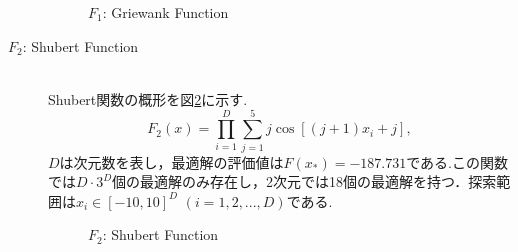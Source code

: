 \documentclass[a4j,11pt]{jarticle}
\begin{document}
\begin{description}
\begin{figure}[h]
\caption{$F_1$: Griewank Function}
\label{fig:dnrba-f1}
\end{figure}

\item[$F_2$: Shubert Function]\mbox{}\\
Shubert関数の概形を図\ref{fig:dnrba-f2}に示す.
 \begin{equation}
F_2(x) = \prod_{i=1}^D \sum_{j=1}^5 j \cos[(j+1)x_i+j], 
\end{equation}
$D$は次元数を表し，最適解の評価値は${F(x_*)=-187.731}$である.この関数では$D \cdot 3^D $個の最適解のみ存在し，2次元では18個の最適解を持つ．探索範囲は$x_i \in [-10, 10]^D$ $(i=1,2,...,D)$である.

\begin{figure}[h]
\centering
{}

\caption{$F_2$: Shubert Function}
\label{fig:dnrba-f2}
\end{figure}

\end{description}
\end{document}

